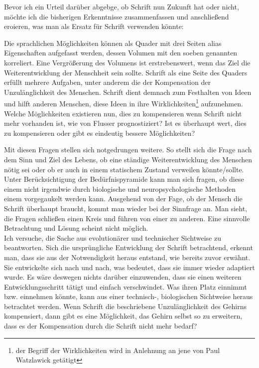 \documentclass[12pt,a4paper,oneside]{article}
\begin{document}
  Bevor ich ein Urteil darüber abgebge, ob Schrift nun Zukunft hat oder nicht, möchte ich die bisherigen Erkenntnisse zusammenfassen und anschließend eroieren, was man als Ersatz für Schrift verwenden könnte:
  
  Die sprachlichen Möglichkeiten können als Quader mit drei Seiten alias Eigenschaften aufgefasst werden, dessen Volumen mit den soeben genannten korreliert. Eine Vergrößerung des Volumens ist erstrebenswert, wenn das Ziel die Weiterentwicklung der Menschheit sein sollte. Schrift als eine Seite des Quaders erfüllt mehrere Aufgaben, unter anderem die der Kompensation der Unzulänglichkeit des Menschen. Schrift dient demnach zum Festhalten von Ideen und hilft anderen Menschen, diese Ideen in ihre Wirklichkeiten\footnote{der Begriff der Wirklichkeiten wird in Anlehnung an jene von Paul Watzlawick getätigt} aufzunehmen. Welche Möglichkeiten existieren nun, dies zu kompensieren wenn Schrift nicht mehr vorhanden ist, wie von Flusser prognostiziert? Ist es überhaupt wert, dies zu kompensieren oder gibt es eindeutig bessere Möglichkeiten?
  
  Mit diesen Fragen stellen sich notgedrungen weitere. So stellt sich die Frage nach dem Sinn und Ziel des Lebens, ob eine ständige Weiterentwicklung des Menschen nötig sei oder ob er auch in einem statischem Zustand verweilen könnte/sollte. Unter Berücksichtigung der Bedürfnispyramide kann man sich fragen, ob diese einem nicht irgendwie durch biologische und neuropsychologische Methoden einem vorgegaukelt werden kann. Ausgehend von der Fage, ob der Mensch die Schrift überhaupt braucht, kommt man wieder bei der Sinnfrage an. Man sieht, die Fragen schließen einen Kreis und führen von einer zu anderen. Eine sinnvolle Betrachtung und Lösung scheint nicht möglich.\\
  
  Ich versuche, die Sache aus evolutionärer und technischer Sichtweise zu beantworten. Sich die ursprüngliche Entwicklung der Schrift betrachtend, erkennt man, dass sie aus der Notwendigkeit heraus entstand, wie bereits zuvor erwähnt. Sie entwickelte sich nach und nach, was bedeutet, dass sie immer wieder adaptiert wurde. Es wäre deswegen nichts darüber einzuwenden, dass sie einen weiteren Entwicklungsschritt tätigt und einfach verschwindet. Was ihren Platz einnimmt bzw. einnehmen könnte, kann aus einer technisch-, biologischen Sichtweise heraus betrachtet werden. Wenn Schrift die beschriebene Unzulänglichkeit des Gehirns kompensiert, dann gibt es eine Möglichkeit, das Gehirn selbst so zu erweitern, dass es der Kompensation durch die Schrift nicht mehr bedarf?
  
\end{document}
